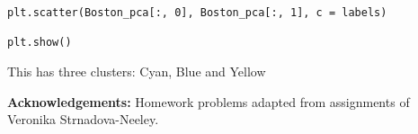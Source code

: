 \documentclass[11pt]{article}
\begin{document}
\begin{enumerate}
\begin{enumerate}
\begin{verbatim}
plt.scatter(Boston_pca[:, 0], Boston_pca[:, 1], c = labels)

plt.show()
        \end{verbatim}
        This has three clusters: Cyan, Blue and Yellow

    \end{enumerate}

\end{enumerate}

{\bf Acknowledgements:} Homework problems adapted from assignments of
Veronika Strnadova-Neeley.
\end{document}
